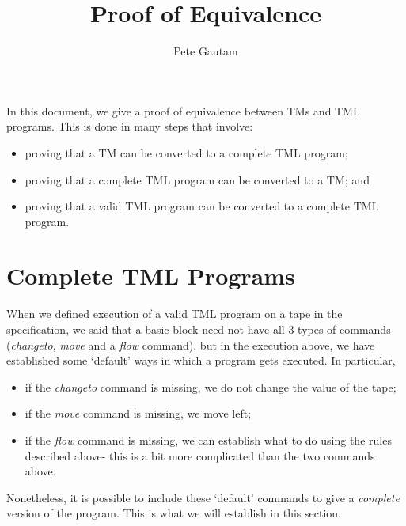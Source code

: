 \documentclass{article}
\title{Proof of Equivalence}
\author{Pete Gautam}
\begin{document}
    \maketitle

    In this document, we give a proof of equivalence between TMs and TML programs. This is done in many steps that involve:
    \begin{itemize}
        \item proving that a TM can be converted to a complete TML program;
        \item proving that a complete TML program can be converted to a TM; and
        \item proving that a valid TML program can be converted to a complete TML program.
    \end{itemize}

    \section{Complete TML Programs}
    When we defined execution of a valid TML program on a tape in the specification, we said that a basic block need not have all 3 types of commands (\textit{changeto}, \textit{move} and a \textit{flow} command), but in the execution above, we have established some `default' ways in which a program gets executed. In particular,
    \begin{itemize}
        \item if the \textit{changeto} command is missing, we do not change the value of the tape;
        \item if the \textit{move} command is missing, we move left;
        \item if the \textit{flow} command is missing, we can establish what to do using the rules described above- this is a bit more complicated than the two commands above.
    \end{itemize}
    Nonetheless, it is possible to include these `default' commands to give a \emph{complete} version of the program. This is what we will establish in this section. 
\end{document}
